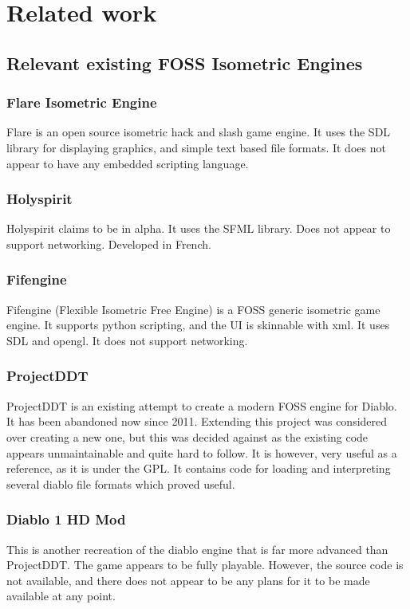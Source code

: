 \chapter{Related work}
    \section{Relevant existing FOSS Isometric Engines}
    	\subsection{Flare Isometric Engine}
    	Flare\cite{flare} is an open source isometric hack and slash game engine. It uses the SDL library for displaying graphics, and simple text based file formats.
    	It does not appear to have any embedded scripting language.
    	
    	\subsection{Holyspirit}
    	Holyspirit\cite{holyspirit} claims to be in alpha. It uses the SFML library. Does not appear to support networking.
    	Developed in French.
    	
    	\subsection{Fifengine}
    	Fifengine\cite{fife} (Flexible Isometric Free Engine) is a FOSS generic isometric game engine.
    	It supports python scripting, and the UI is skinnable with xml.
    	It uses SDL and opengl. It does not support networking.
    	
    	\subsection{ProjectDDT}
    	ProjectDDT\cite{ddt} is an existing attempt to create a modern FOSS engine for Diablo.
    	It has been abandoned now since 2011.
    	Extending this project was considered over creating a new one, but this was decided against as the existing code appears unmaintainable and quite hard to follow.
    	It is however, very useful as a reference, as it is under the GPL.
    	It contains code for loading and interpreting several diablo file formats which proved useful.
    	
    	\subsection{Diablo 1 HD Mod}
    	This\cite{d1hd} is another recreation of the diablo engine that is far more advanced than ProjectDDT. The game appears to be fully playable. However, the source code is not available, and there does not appear to be any plans for it to be made available at any point.
